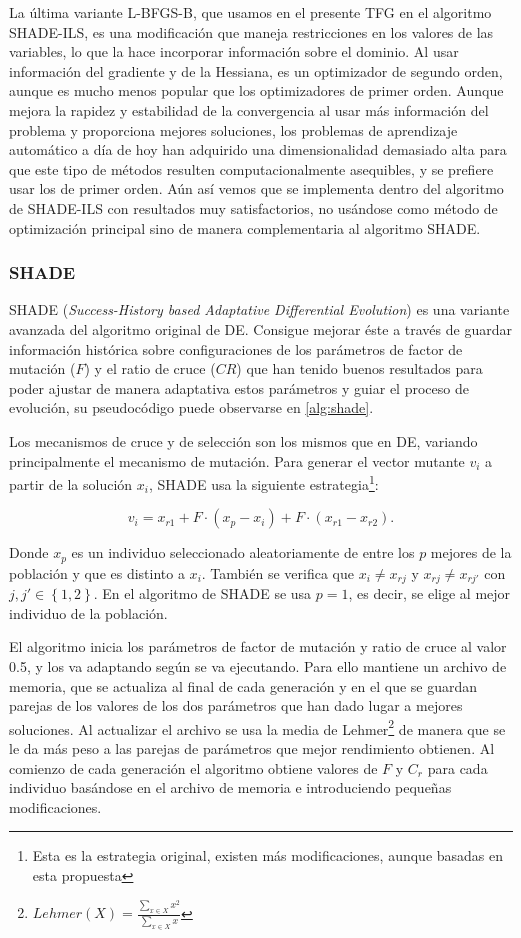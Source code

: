 La última variante L-BFGS-B, que usamos en el presente TFG en el algoritmo SHADE-ILS, es una modificación que maneja restricciones en los valores de las variables, lo que la hace incorporar información sobre el dominio. Al usar información del gradiente y de la Hessiana, es un optimizador de segundo orden, aunque es mucho menos popular que los optimizadores de primer orden. Aunque mejora la rapidez y estabilidad de la convergencia al usar más información del problema y proporciona mejores soluciones, los problemas de aprendizaje automático a día de hoy han adquirido una dimensionalidad demasiado alta para que este tipo de métodos resulten computacionalmente asequibles, y se prefiere usar los de primer orden. Aún así vemos que se implementa dentro del algoritmo de SHADE-ILS con resultados muy satisfactorios, no usándose como método de optimización principal sino de manera complementaria al algoritmo SHADE.


\subsubsection{SHADE}

SHADE (\textit{Success-History based Adaptative Differential Evolution}) \cite{shade} es una variante avanzada del algoritmo original de DE. Consigue mejorar éste a través de guardar información histórica sobre configuraciones de los parámetros de factor de mutación ($F$) y el ratio de cruce ($CR$) que han tenido buenos resultados para poder ajustar de manera adaptativa estos parámetros y guiar el proceso de evolución, su pseudocódigo puede observarse en \ref{alg:shade}. 

Los mecanismos de cruce y de selección son los mismos que en DE, variando principalmente el mecanismo de mutación. Para generar el vector mutante $v_i$ a partir de la solución $x_i$, SHADE usa la siguiente estrategia\footnote{Esta es la estrategia original, existen más modificaciones, aunque basadas en esta propuesta}:

$$v_i = x_{r1} + F \cdot (x_p - x_i)  + F \cdot (x_{r1} - x_{r2}).$$

Donde $x_p$ es un individuo seleccionado aleatoriamente de entre los $p$ mejores de la población y que es distinto a $x_i$. También se verifica que $x_i  \neq x_{rj}$ y $x_{rj} \neq x_{rj'}$ con $j, j' \in \left \{ 1,2 \right \}$. En el algoritmo de SHADE se usa $p=1$, es decir, se elige al mejor individuo de la población.

El algoritmo inicia los parámetros de factor de mutación y ratio de cruce al valor 0.5, y los va adaptando según se va ejecutando. Para ello mantiene un archivo de memoria, que se actualiza al final de cada generación y en el que se guardan parejas de los valores de los dos parámetros que han dado lugar a mejores soluciones. Al actualizar el archivo se usa la media de Lehmer\footnote{$Lehmer(X) = \frac{\sum_{x\in X} x^2}{\sum_{x\in X} x}$}  de manera que se le da más peso a las parejas de parámetros que mejor rendimiento obtienen. Al comienzo de cada generación el algoritmo obtiene valores de $F$ y $C_r$ para cada individuo basándose en el archivo de memoria e introduciendo pequeñas modificaciones.


